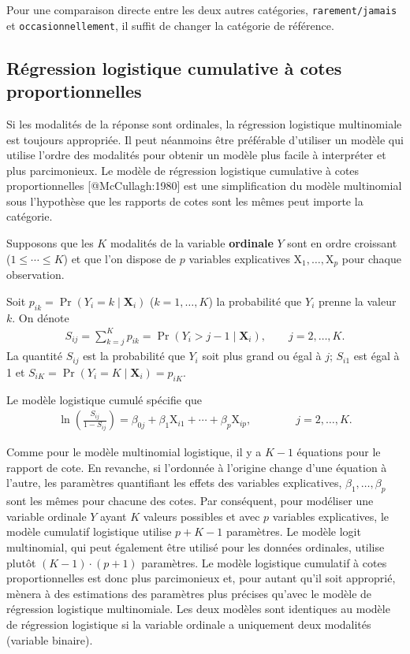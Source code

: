 \documentclass[
  11pt,
  letterpaper,
]{book}
\theoremstyle{definition}
\theoremstyle{remark}
\begin{document}
Pour une comparaison directe entre les deux autres catégories,
\texttt{rarement/jamais} et \texttt{occasionnellement}, il suffit de
changer la catégorie de référence.

\hypertarget{ruxe9gression-logistique-cumulative-uxe0-cotes-proportionnelles}{%
\subsection{Régression logistique cumulative à cotes
proportionnelles}\label{ruxe9gression-logistique-cumulative-uxe0-cotes-proportionnelles}}

Si les modalités de la réponse sont ordinales, la régression logistique
multinomiale est toujours appropriée. Il peut néanmoins être préférable
d'utiliser un modèle qui utilise l'ordre des modalités pour obtenir un
modèle plus facile à interpréter et plus parcimonieux. Le modèle de
régression logistique cumulative à cotes proportionnelles
{[}@McCullagh:1980{]} est une simplification du modèle multinomial sous
l'hypothèse que les rapports de cotes sont les mêmes peut importe la
catégorie.

Supposons que les \(K\) modalités de la variable \textbf{ordinale} \(Y\)
sont en ordre croissant (\(1 \leq \cdots \leq K\)) et que l'on dispose
de \(p\) variables explicatives \(\mathrm{X}_1, \ldots, \mathrm{X}_p\)
pour chaque observation.

Soit \(p_{ik}=\Pr(Y_i=k \mid \mathbf{X}_{i})\) (\(k=1, \ldots, K\)) la
probabilité que \(Y_{i}\) prenne la valeur \(k\). On dénote
\begin{align*}
S_{ij}=\sum_{k=j}^K p_{ik}= \Pr(Y_{i} > j - 1 \mid \mathbf{X}_{i}), \qquad j=2, \ldots, K.
\end{align*} La quantité \(S_{ij}\) est la probabilité que \(Y_i\) soit
plus grand ou égal à \(j\); \(S_{i1}\) est égal à 1 et
\(S_{iK} = \Pr(Y_i=K \mid \mathbf{X}_{i})=p_{iK}\).

Le modèle logistique cumulé spécifie que \begin{align*}
\ln \left( \frac{S_{ij}}{1-S_{ij}}\right) = \beta_{0j} + \beta_1 \mathrm{X}_{i1} + \cdots + \beta_p \mathrm{X}_{ip}, \qquad \qquad  j=2, \ldots, K.
\end{align*}

Comme pour le modèle multinomial logistique, il y a \(K-1\) équations
pour le rapport de cote. En revanche, si l'ordonnée à l'origine change
d'une équation à l'autre, les paramètres quantifiant les effets des
variables explicatives, \(\beta_1, \ldots, \beta_p\) sont les mêmes pour
chacune des cotes. Par conséquent, pour modéliser une variable ordinale
\(Y\) ayant \(K\) valeurs possibles et avec \(p\) variables
explicatives, le modèle cumulatif logistique utilise \(p + K - 1\)
paramètres. Le modèle logit multinomial, qui peut également être utilisé
pour les données ordinales, utilise plutôt \((K-1) \cdot(p+1)\)
paramètres. Le modèle logistique cumulatif à cotes proportionnelles est
donc plus parcimonieux et, pour autant qu'il soit approprié, mènera à
des estimations des paramètres plus précises qu'avec le modèle de
régression logistique multinomiale. Les deux modèles sont identiques au
modèle de régression logistique si la variable ordinale a uniquement
deux modalités (variable binaire).
\end{document}
